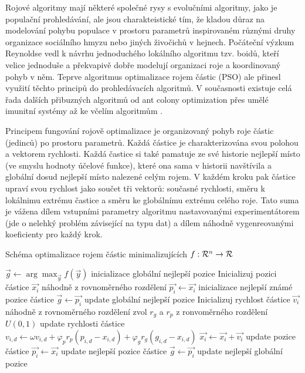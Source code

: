 
Rojové algoritmy mají některé společné rysy s evolučními algoritmy, jako je populační prohledávání, ale jsou charakteistické tím, že kladou důraz na modelování pohybu populace v prostoru parametrů inspirovaném různými druhy organizace sociálního hmyzu nebo jiných živočichů v hejnech. Počáteční výzkum Reynoldse vedl k návrhu jednoduchého lokálního algoritmu tzv. boidů, kteří velice jednoduše a překvapivě dobře modelují organizaci roje a koordinovaný pohyb v něm. Teprve algoritmus optimalizace rojem částic (PSO) ale přinesl využití těchto principů do prohledávacích algoritmů. V současnosti existuje celá řada dalších přibuzných algoritmů od ant colony optimization přes umělé imunitní systémy až ke včelím algoritmům \cite{swarm}. 

Principem fungování rojově optimalizace je organizovaný pohyb roje částic (jedinců) po prostoru parametrů. Každá částice je charakterizována svou polohou a vektorem rychlosti. Každá častice si také pamatuje ze své historie nejlepší místo (ve smyslu hodnoty účelové funkce), které ona sama v historii navštívila a globální dosud nejlepší místo nalezené celým rojem. V každém kroku pak částice upraví svou rychlost jako součet tři vektorů: současné rychlosti, směru k lokálnimu extrému častice a směru ke globálnímu extrému celého roje. Tato suma je vážena dílem vstupními parametry algoritmu nastavovanými experimentátorem (jde o nelehký problém závisející na typu dat) a dílem náhodně vygenreovanými koeficienty pro každý krok. 

\begin{algorithm}
\caption{Schéma optimalizace rojem částic minimalizujících $f:{\mathcal{R}}^n\to{\ensuremath{\mathcal{R}}}$}
\label{obrswarm}
\begin{algorithmic}
\State $\vec{g} \gets \arg\max_{\vec{y}} f(\vec{y})$ \Comment inicializace globální nejlepší pozice
\State Inicializuj pozici částice $\vec{x_i}$ náhodně z rovnoměrného rozdělení
\State $\vec{p_i} \gets \vec{x_i}$ \Comment inicializace nejlepší známé pozice částice
\State $\vec{g} \gets \vec{p_i}$ \Comment update globální nejlepší pozice
\EndIf
\State Inicializuj rychlost částice $\vec{v_i}$ náhodně z rovnoměrného rozdělení
\EndFor
{}
\State 	zvol $r_g$ a $r_p$ z ronvoměrného rozdělení $U(0,1)$
 \Comment update rychlosti částice
\State $v_{i,d} \gets \omega v_{i,d} + \varphi_p r_p (p_{i,d} - x_{i,d}) + \varphi_g r_g (g_{i,d} - x_{i,d})$
\EndFor
\State $\vec{x_i} \gets \vec{x_i} + \vec{v_i}$ \Comment update pozice částice
\State $\vec{p_i} \gets \vec{x_i}$ \Comment update nejlepší pozice částice
\State $\vec{g} \gets \vec{p_i}$ \Comment update nejlepší globální pozice
\EndIf
\EndIf
\EndFor
\EndWhile
\EndProcedure
\end{algorithmic}
\end{algorithm}

